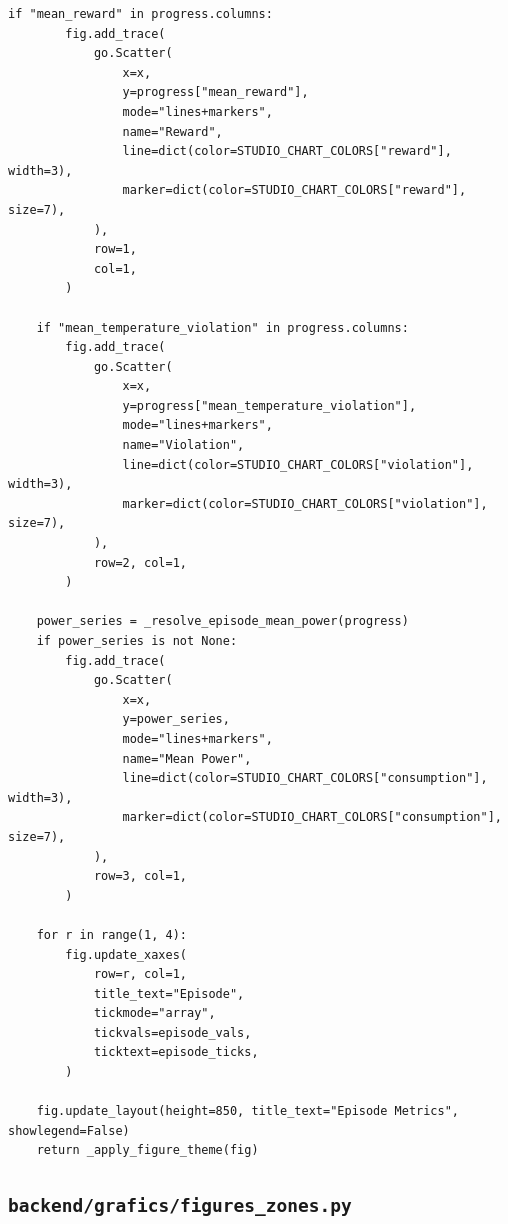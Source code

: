 \documentclass[10pt,a4paper]{article}
\begin{document}
\begin{lstlisting}[style=studioPython,caption={backend/grafics/episode.py},label={lst:backend-grafics-episode-py}]
    if "mean_reward" in progress.columns:
        fig.add_trace(
            go.Scatter(
                x=x,
                y=progress["mean_reward"],
                mode="lines+markers",
                name="Reward",
                line=dict(color=STUDIO_CHART_COLORS["reward"], width=3),
                marker=dict(color=STUDIO_CHART_COLORS["reward"], size=7),
            ),
            row=1,
            col=1,
        )

    if "mean_temperature_violation" in progress.columns:
        fig.add_trace(
            go.Scatter(
                x=x,
                y=progress["mean_temperature_violation"],
                mode="lines+markers",
                name="Violation",
                line=dict(color=STUDIO_CHART_COLORS["violation"], width=3),
                marker=dict(color=STUDIO_CHART_COLORS["violation"], size=7),
            ),
            row=2, col=1,
        )

    power_series = _resolve_episode_mean_power(progress)
    if power_series is not None:
        fig.add_trace(
            go.Scatter(
                x=x,
                y=power_series,
                mode="lines+markers",
                name="Mean Power",
                line=dict(color=STUDIO_CHART_COLORS["consumption"], width=3),
                marker=dict(color=STUDIO_CHART_COLORS["consumption"], size=7),
            ),
            row=3, col=1,
        )

    for r in range(1, 4):
        fig.update_xaxes(
            row=r, col=1,
            title_text="Episode",
            tickmode="array",
            tickvals=episode_vals,
            ticktext=episode_ticks,
        )

    fig.update_layout(height=850, title_text="Episode Metrics", showlegend=False)
    return _apply_figure_theme(fig)
\end{lstlisting}


\subsection{\texorpdfstring{\texttt{backend/grafics/figures\_zones.py}}{backend/grafics/figures\_zones.py}}
\end{document}
